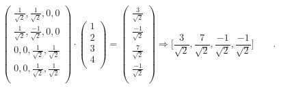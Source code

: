 \documentclass{beamer}
\begin{document}
\begin{frame}
{			\begin{equation*}
			\begin{pmatrix}
			\frac{1}{\sqrt{2}}, \frac{1}{\sqrt{2}}, 0, 0\\
			\frac{1}{\sqrt{2}}, \frac{-1}{\sqrt{2}}, 0, 0\\
			0, 0, \frac{1}{\sqrt{2}}, \frac{1}{\sqrt{2}}\\
			0, 0, \frac{1}{\sqrt{2}}, \frac{1}{\sqrt{2}}\\
			\end{pmatrix} 
			\cdot
			\begin{pmatrix}
			1\\
			2\\
			3\\
			4\\
			\end{pmatrix} 
			=
			\begin{pmatrix}
			\frac{3}{\sqrt{2}}\\
			\frac{-1}{\sqrt{2}}\\
			\frac{7}{\sqrt{2}}\\
			\frac{-1}{\sqrt{2}}\\
			\end{pmatrix}
			\Rightarrow \Big[
			\frac{3}{\sqrt{2}},
			\frac{7}{\sqrt{2}},
			\frac{-1}{\sqrt{2}},
			\frac{-1}{\sqrt{2}}
			\Big]\qquad.
			\end{equation*}
		}

	\end{frame}
\end{document}
